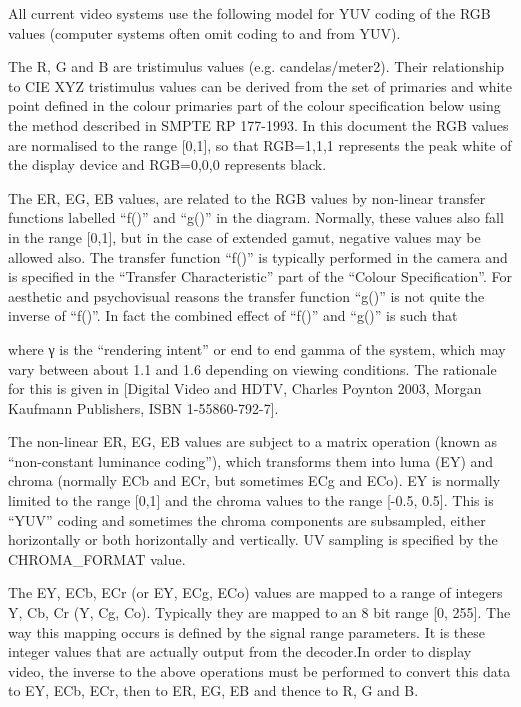 All current video systems use the following model for YUV coding of the
RGB values (computer systems often omit coding to and from YUV). 

The R, G and B are tristimulus values (e.g. candelas/meter2). Their
relationship to CIE XYZ tristimulus values can be derived from the set
of primaries and white point defined in the colour primaries part of the
colour specification below using the method described in SMPTE RP
177-1993. In this document the RGB values are normalised to the range
[0,1], so that RGB=1,1,1 represents the peak white of the display device
and RGB=0,0,0 represents black.

The ER, EG, EB values, are related to the RGB values by non-linear
transfer functions labelled “f()” and “g()” in the
diagram. Normally, these values also fall in the range [0,1], but in the
case of extended gamut, negative values may be allowed also. The
transfer function “f()” is typically performed in the camera and
is specified in the “Transfer Characteristic” part of the
“Colour Specification”. For aesthetic and psychovisual reasons
the transfer function “g()” is not quite the inverse of
“f()”. In fact the combined effect of “f()” and
“g()” is such that



where γ is the “rendering intent” or end to end gamma of the
system, which may vary between about 1.1 and 1.6 depending on viewing
conditions. The rationale for this is given in [Digital Video and HDTV,
Charles Poynton 2003, Morgan Kaufmann Publishers, ISBN 1-55860-792-7].

The non-linear ER, EG, EB values are subject to a matrix operation
(known as “non-constant luminance coding”), which transforms
them into luma (EY) and chroma (normally ECb and ECr, but sometimes ECg
and ECo). EY is normally limited to the range [0,1] and the chroma
values to the range [-0.5, 0.5]. This is “YUV” coding and
sometimes the chroma components are subsampled, either horizontally or
both horizontally and vertically. UV sampling is specified by the
CHROMA\_FORMAT value. 

The EY, ECb, ECr (or EY, ECg, ECo) values are mapped to a range of
integers Y, Cb, Cr (Y, Cg, Co). Typically they are mapped to an 8 bit
range [0, 255]. The way this mapping occurs is defined by the signal
range parameters. It is these integer values that are actually output
from the decoder.In order to display video, the inverse to the above
operations must be performed to convert this data to EY, ECb, ECr, then
to ER, EG, EB and thence to R, G and B.  

